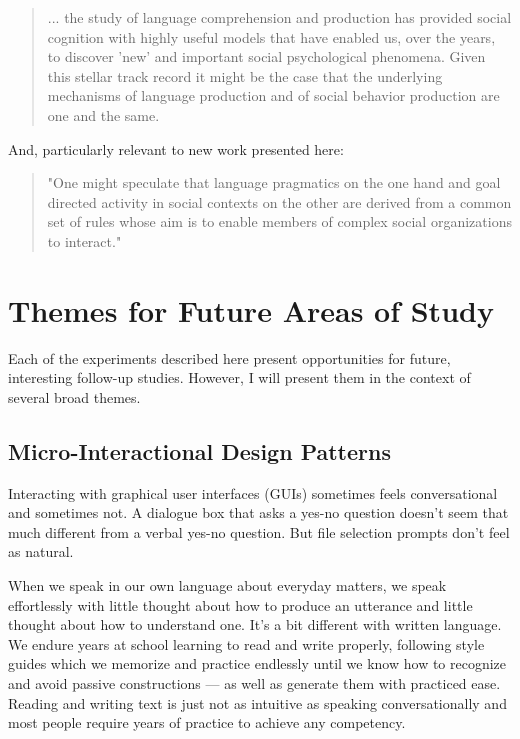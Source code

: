 \begin{quote}
... the study of language comprehension and production has provided social cognition with highly useful models that have enabled us, over the years, to discover 'new' and important social psychological phenomena. Given this stellar track record it might be the case that the underlying mechanisms of language production and of social behavior production are one and the same. \citep[p. 16]{Bargh:2006bo}
\end{quote}

And, particularly relevant to new work presented here:
\begin{quote}
"One might speculate that language pragmatics on the one hand and goal directed activity in social contexts on the other are derived from a common set of rules whose aim is to enable members of complex social organizations to interact." \citep[p. 105]{Girotto:1990va}
\end{quote}


\section{Themes for Future Areas of Study}
\label{themesforfutureareasofstudy}

Each of the experiments described here present opportunities for future, interesting follow-up studies. However, I will present them in the context of several broad themes.

\subsection{Micro-Interactional Design Patterns}
\label{micro-interactionaldesignpatterns}

Interacting with graphical user interfaces (GUIs) sometimes feels conversational and sometimes not. A dialogue box that asks a yes-no question doesn't seem that much different from a verbal yes-no question. But file selection prompts don't feel as natural.

When we speak in our own language about everyday matters, we speak effortlessly with little thought about how to produce an utterance and little thought about how to understand one. It's a bit different with written language. We endure years at school learning to read and write properly, following style guides which we memorize and practice endlessly until we know how to recognize and avoid passive constructions --- as well as generate them with practiced ease. Reading and writing text is just not as intuitive as speaking conversationally and most people require years of practice to achieve any competency.

